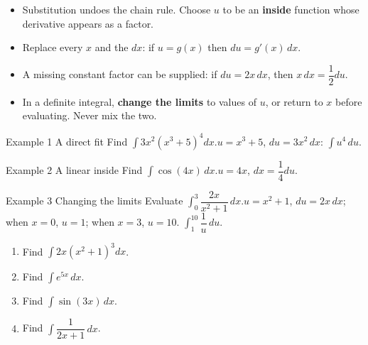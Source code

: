\documentclass[11pt]{article}
\begin{document}

\begin{ideabox}
\begin{itemize}[leftmargin=*,itemsep=2pt,topsep=2pt]
  \item Substitution undoes the chain rule. Choose $u$ to be an \textbf{inside} function whose derivative appears as a factor.
  \item Replace every $x$ and the $dx$: if $u=g(x)$ then $du=g'(x)\,dx$.
  \item A missing constant factor can be supplied: if $du=2x\,dx$, then $x\,dx=\dfrac12du$.
  \item In a definite integral, \textbf{change the limits} to values of $u$, or return to $x$ before evaluating. Never mix the two.
\end{itemize}
\end{ideabox}

\begin{example}{Example 1 \textperiodcentered{} A direct fit}
Find $\displaystyle\int3x^2\left(x^3+5\right)^4dx$.\soln $u=x^3+5$, $du=3x^2\,dx$: $\displaystyle\int u^4\,du$.
\end{example}

\begin{example}{Example 2 \textperiodcentered{} A linear inside}
Find $\displaystyle\int\cos(4x)\,dx$.\soln $u=4x$, $dx=\dfrac14du$.
\end{example}

\begin{example}{Example 3 \textperiodcentered{} Changing the limits}
Evaluate $\displaystyle\int_{0}^{3}\dfrac{2x}{x^2+1}\,dx$.\soln $u=x^2+1$, $du=2x\,dx$; when $x=0$, $u=1$; when $x=3$, $u=10$. $\displaystyle\int_{1}^{10}\dfrac1u\,du$.
\end{example}

\newpage
{}

\begin{enumerate}[leftmargin=*,itemsep=2pt]
  \item Find $\displaystyle\int2x\left(x^2+1\right)^3dx$.\work{2.3cm}
  \item Find $\displaystyle\int e^{5x}\,dx$.\work{2.3cm}
  \item Find $\displaystyle\int\sin(3x)\,dx$.\work{2.3cm}
  \item Find $\displaystyle\int\dfrac{1}{2x+1}\,dx$.\work{2.3cm}
\end{enumerate}
\end{document}
